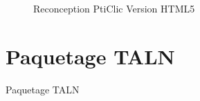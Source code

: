 \documentclass{beamer}
\begin{document}
\begin{frame}
\begin{figure}[h!]
\caption{Reconception PtiClic Version HTML5}
\end{figure}
\end{frame}



\section{Paquetage TALN}

\begin{frame}
  \begin{center}
    \Huge Paquetage TALN
  \end{center}
\end{frame}
\end{document}
